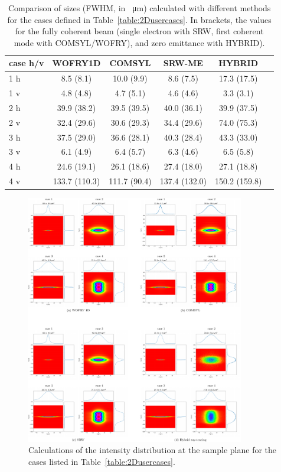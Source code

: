 \documentclass{iucr}              %
\begin{document}
\begin{table}[]
    \label{table:comparison}
    \caption{Comparison of sizes (FWHM, in \SI{}{\micro\meter}) calculated with different methods for the cases defined in Table~\ref{table:2Dusercases}.
    In brackets, the values for the fully coherent beam (single electron with SRW, first coherent mode with COMSYL/WOFRY), and zero emittance with HYBRID). 
    }
    \centering
    \begin{tabular}{p{}|c|c|c|c|c}
         case h/v &
         WOFRY1D&
         COMSYL&
         SRW-ME&
         HYBRID \\
         \hline
1 h  & 8.5 (8.1)    & 10.0 (9.9)  & 8.6 (7.5)   & 17.3 (17.5) \\
1 v  & 4.8 (4.8)    & 4.7 (5.1)   & 4.6 (4.6)   & 3.3 (3.1) \\
\hline
2 h  & 39.9 (38.2)  & 39.5 (39.5) & 40.0 (36.1)  & 39.9 (37.5) \\
2 v  & 32.4 (29.6)  & 30.6 (29.3) & 34.4 (29.6)  & 74.0 (75.3) \\
\hline
3 h  & 37.5 (29.0)  & 36.6 (28.1) & 40.3 (28.4)  & 43.3 (33.0) \\
3 v  & 6.1 (4.9)   & 6.4 (5.7)   & 6.3 (4.6)    & 6.5 (5.8) \\
\hline
4 h  & 24.6 (19.1)  & 26.1 (18.6)  & 27.4 (18.0)   & 27.1 (18.8) \\
4 v  & 133.7 (110.3)& 111.7 (90.4) & 137.4 (132.0) & 150.2 (159.8) \\
    \end{tabular}
\end{table}



\newpage
\onecolumn

\begin{figure}
    \label{fig:sim_results}
    \includegraphics[width=0.85\textwidth]{figures/fig_sim_results.pdf}
    \caption{Calculations of the intensity distribution at the sample plane for the cases listed in Table~\ref{table:2Dusercases}.}
\end{figure}
\end{document}
